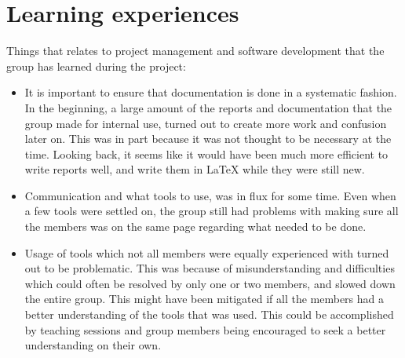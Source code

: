 \section{Learning experiences}
Things that relates to project management and software development that the group has learned during the project:
\begin{itemize}
 \item  It is important to ensure that documentation is done in a systematic fashion. In the beginning, a large amount of the reports and documentation that the group made for internal use, turned out to create more work and confusion later on. This was in part because it was not thought to be necessary at the time. Looking back, it seems like it would have been much more efficient to write reports well, and write them in LaTeX  while they were still new.
 \item Communication and what tools to use, was in flux for some time. Even when a few tools were settled on, the group still had problems with making sure all the members was on the same page regarding what needed to be done. 
 \item  Usage of tools which not all members were equally experienced with turned out to be problematic. This was because of misunderstanding and difficulties which could often be resolved by only one or two members, and slowed down the entire group. This might have been mitigated if all the members had a better understanding of the tools that was used. This could be accomplished by teaching sessions and group members being encouraged to seek a better understanding on their own.
 \end{itemize} 